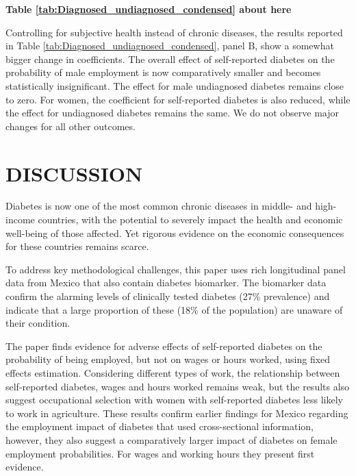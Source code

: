 \documentclass[12pt,english]{article}
\begin{document}
\begin{center}
	\textbf{Table \ref{tab:Diagnosed_undiagnosed_condensed} about here}
\end{center}

Controlling for subjective health instead of chronic diseases, the results reported in Table \ref{tab:Diagnosed_undiagnosed_condensed}, panel B, show a somewhat bigger change in coefficients. The overall effect of self-reported diabetes on the probability of male employment is now comparatively smaller and becomes statistically insignificant. The effect for male undiagnosed diabetes remains close to zero. For women, the coefficient for self-reported diabetes is also reduced, while the effect for undiagnosed diabetes remains the same. We do not observe major changes for all other outcomes.   






\section{\label{sec:cha_4_conclusion}DISCUSSION}

Diabetes is now one of the most common chronic diseases in middle- and high-income countries, with the potential to severely impact the health and economic well-being of those affected. Yet rigorous evidence on the economic consequences for these countries
remains scarce. 

To address key methodological challenges, this paper uses rich longitudinal panel data from Mexico that also contain diabetes biomarker. The biomarker data confirm the alarming levels of clinically tested diabetes (27\% prevalence) and indicate that a large proportion of these (18\% of the population) are unaware of their condition.

The paper finds evidence for adverse effects of self-reported diabetes on the probability of being employed, but not on wages or hours worked, using fixed effects estimation. Considering different types of work, the relationship between self-reported diabetes, wages
and hours worked remains weak, but the results also suggest occupational selection with women with self-reported diabetes less likely to work in agriculture. These results confirm earlier findings for Mexico regarding the employment impact of diabetes that used cross-sectional information, however, they also suggest a comparatively larger impact of diabetes on female employment probabilities. For wages and working hours they present first evidence.
\end{document}

